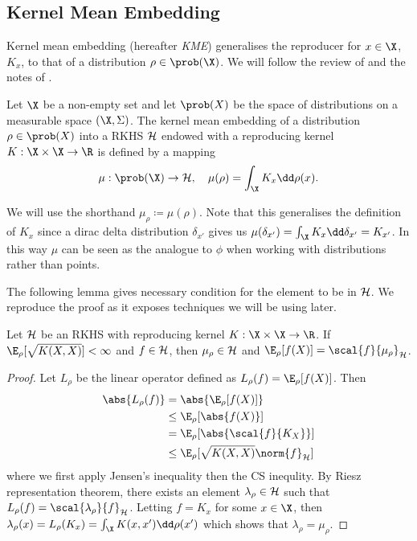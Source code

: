 \subsection{Kernel Mean Embedding} Kernel mean embedding (hereafter \emph{KME})
generalises the reproducer for \(x \in \X\), \(K_{x}\), to that of a
distribution \(\rho \in \prob(\X)\). We will follow the review of
\cite{muandet17_kernel_mean_embed_distr} and the notes of
\cite{gretton18_advan_topic_machin_learn}.

\begin{definition}
  \label{def:kernel-mean-embedding} Let \(\X\) be a non-empty set and let
\(\prob(X)\) be the space of distributions on a measurable space \((\X,
\Sigma)\). The kernel mean embedding of a distribution \(\rho \in \prob(X)\)
into a RKHS \(\mathcal{H}\) endowed with a reproducing kernel \(K: \X \times \X \to
\R\) is defined by a mapping
  \begin{equation}
    \label{eq:kernel-mean-embedding} \mu : \prob(\X) \to \rkhs{H}, \quad
\mu(\rho) = \int_{\X} K_{x} \dd \rho(x).
  \end{equation}
\end{definition} We will use the shorthand \(\mu_{\rho} \coloneqq \mu(\rho)\).
Note that this generalises the definition of \(K_{x}\) since a dirac delta
distribution \(\delta_{x'}\) gives us \(\mu(\delta_{x'}) = \int_{\X}K_{x} \dd
\delta_{x'} = K_{x'}\). In this way \(\mu\) can be seen as the analogue to
\(\phi\) when working with distributions rather than points.

The following lemma gives necessary condition for the element to be in
\(\mathcal{H}\). We reproduce the proof as it exposes techniques we will be using
later.

\begin{theorem} Let \(\mathcal{H}\) be an RKHS with reproducing kernel \(K: \X
\times \X \to \R\). If \(\E_{\rho}[\sqrt{K(X, X)}] < \infty\) and \(f \in
\mathcal{H}\), then \(\mu_{\rho} \in \mathcal{H}\) and \(\E_{\rho}[f(X)] =
\scal{f}{\mu_{\rho}}_{\rkhs{H}}\).
\end{theorem}

\begin{proof} Let \(L_{\rho}\) be the linear operator defined as \(L_{\rho}(f) =
\E_{\rho}[f(X)]\). Then
  \begin{align*} \abs{ L_{\rho}(f) } & = \abs{\E_{\rho}[f(X)]} \\ & \leq
\E_{\rho}[\abs{f(X)}] \\ & = \E_{\rho}[\abs{\scal{f}{K_{X}}}] \\ & \leq
\E_{\rho}[\sqrt{K(X, X)} \norm{f}_{\rkhs{H}}]
  \end{align*} where we first apply Jensen's inequality then the CS inequlity.
By Riesz representation theorem, there exists an element \(\lambda_{\rho} \in
\mathcal{H}\) such that \(L_{\rho}(f) = \scal{\lambda_{\rho}}{f}_{\rkhs{H}}\).
Letting \(f = K_{x}\) for some \(x \in \X\), then \(\lambda_{\rho}(x) =
L_{\rho}(K_{x}) = \int_{\X} K(x, x') \dd \rho(x')\) which shows that
\(\lambda_{\rho} = \mu_{\rho}\).
\end{proof}

